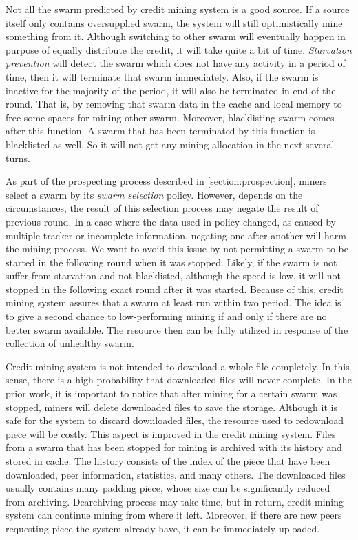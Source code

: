 Not all the swarm predicted by credit mining system is a good source. If a source itself only contains oversupplied swarm, the system will still optimistically mine something from it. Although switching to other swarm will eventually happen in purpose of equally distribute the credit, it will take quite a bit of time. \textit{Starvation prevention} will detect the swarm which does not have any activity in a period of time, then it will terminate that swarm immediately. Also, if the swarm is inactive for the majority of the period, it will also be terminated in end of the round. That is, by removing that swarm data in the cache and local memory to free some spaces for mining other swarm. Moreover, blacklisting swarm comes after this function. A swarm that has been terminated by this function is blacklisted as well. So it will not get any mining allocation in the next several turns.

As part of the prospecting process described in \ref{section:prospection}, miners select a swarm by its \textit{swarm selection} policy. However, depends on the circumstances, the result of this selection process may negate the result of previous round. In a case where the data used in policy changed, as caused by multiple tracker or incomplete information, negating one after another will harm the mining process. We want to avoid this issue by not permitting a swarm to be started in the following round when it was stopped. Likely, if the swarm is not suffer from starvation and not blacklisted, although the speed is low, it will not stopped in the following exact round after it was started. Because of this, credit mining system assures that a swarm at least run within two period. The idea is to give a second chance to low-performing mining if and only if there are no better swarm available.  The resource then can be fully utilized in response of the collection of unhealthy swarm. 

Credit mining system is not intended to download a whole file completely. In this sense, there is a high probability that downloaded files will never complete. In the prior work, it is important to notice that after mining for a certain swarm was stopped, miners will delete downloaded files to save the storage. Although it is safe for the system to discard downloaded files, the resource used to redownload piece will be costly. This aspect is improved in the credit mining system. Files from a swarm that has been stopped for mining is archived with its history and stored in cache. The history consists of the index of the piece that have been downloaded, peer information, statistics, and many others. The downloaded files usually contains many padding piece, whose size can be significantly reduced from archiving. Dearchiving process may take time, but in return, credit mining system can continue mining from where it left. Moreover, if there are new peers requesting piece the system already have, it can be immediately uploaded.